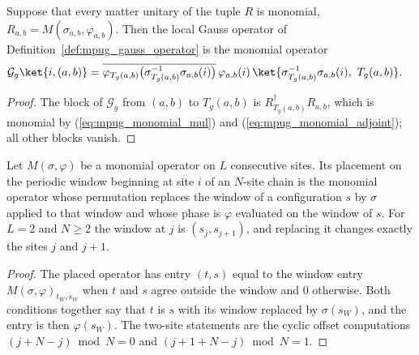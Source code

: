 \begin{lemma}
    \label{thm:mpug_gauss_operator_monomial}
    \leanok
    Suppose that every matter unitary of the tuple $R$ is monomial,
    $R_{a,b}=M(\sigma_{a,b},\varphi_{a,b})$. Then the local Gauss operator
    of Definition~\ref{def:mpug_gauss_operator} is the monomial operator
    \begin{align}
        \mathcal G_g\ket{i,(a,b)}
         & =\overline{\varphi_{T_g(a,b)}\bigl(\sigma_{T_g(a,b)}^{-1}\sigma_{a,b}(i)\bigr)}\,
        \varphi_{a,b}(i)\,
        \ket{\sigma_{T_g(a,b)}^{-1}\sigma_{a,b}(i),\ T_g(a,b)}.
        \label{eq:mpug_gauss_operator_monomial}
    \end{align}
\end{lemma}

\begin{proof}\leanok
    The block of $\mathcal G_g$ from $(a,b)$ to $T_g(a,b)$ is
    $R_{T_g(a,b)}^\dagger R_{a,b}$, which is monomial by
    (\ref{eq:mpug_monomial_mul}) and (\ref{eq:mpug_monomial_adjoint}); all
    other blocks vanish.
\end{proof}

\begin{lemma}
    \label{thm:mpug_embed_monomial}
    \leanok
    Let $M(\sigma,\varphi)$ be a monomial operator on $L$ consecutive sites.
    Its placement on the periodic window beginning at site $i$ of an $N$-site
    chain is the monomial operator whose permutation replaces the window of a
    configuration $s$ by $\sigma$ applied to that window and whose phase is
    $\varphi$ evaluated on the window of $s$. For $L=2$ and $N\geq2$ the
    window at $j$ is $(s_j,s_{j+1})$, and replacing it changes exactly the
    sites $j$ and $j+1$.
\end{lemma}

\begin{proof}\leanok
    The placed operator has entry $(t,s)$ equal to the window entry
    $M(\sigma,\varphi)_{t_W,s_W}$ when $t$ and $s$ agree outside the window
    and $0$ otherwise. Both conditions together say that $t$ is $s$ with its
    window replaced by $\sigma(s_W)$, and the entry is then
    $\varphi(s_W)$. The two-site statements are the cyclic offset
    computations $(j+N-j)\bmod N=0$ and $(j+1+N-j)\bmod N=1$.
\end{proof}

